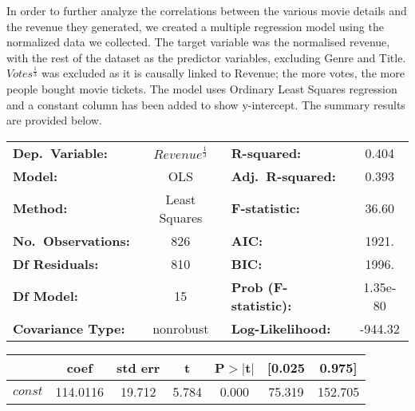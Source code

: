             In order to further analyze the correlations between the various movie details
                and the revenue they generated, we created a multiple regression model using
                the normalized data we collected.
            The target variable was the normalised revenue, with the rest of the dataset as
                the predictor variables, excluding Genre and Title.
            $Votes^\frac{1}{3}$ was excluded as it is causally linked to Revenue; the more votes, the more people bought movie tickets.
            The model uses Ordinary Least Squares regression and a constant column has been
                added to show y-intercept.
            The summary results are provided below.
            \begin{table}[H]
                \begin{center}
                    \begin{tabular}{lclc}
                        \toprule
                        \textbf{Dep.~Variable:}    & $Revenue^{\frac{1}{3}}$ & \textbf{  R-squared:         } & 0.404    \\
                        \textbf{Model:}            & OLS                     & \textbf{  Adj.~R-squared:    } & 0.393    \\
                        \textbf{Method:}           & Least Squares           & \textbf{  F-statistic:       } & 36.60    \\
                        \textbf{No.~Observations:} & 826                     & \textbf{  AIC:               } & 1921.    \\
                        \textbf{Df Residuals:}     & 810                     & \textbf{  BIC:               } & 1996.    \\
                        \textbf{Df Model:}         & 15                      & \textbf{  Prob (F-statistic):} & 1.35e-80 \\
                        \textbf{Covariance Type:}  & nonrobust               & \textbf{  Log-Likelihood:    } & -944.32  \\
                        \bottomrule
                    \end{tabular}
                    \begin{tabular}{lcccccc}
                                                        & \textbf{coef} & \textbf{std err} & \textbf{t} & \textbf{P$> |$t$|$} & \textbf{[0.025} & \textbf{0.975]} \\
                        \midrule
                        \textbf{$const$}                & 114.0116      & 19.712           & 5.784      & 0.000               & 75.319          & 152.705         \\

\end{tabular}
\end{center}
\end{table}
